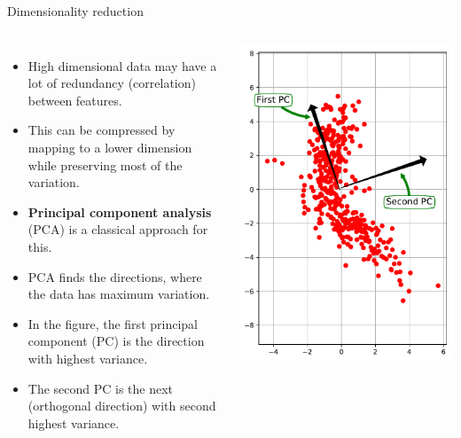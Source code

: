 \documentclass[10pt, aspectratio=169]{beamer} %
\begin{document}
\begin{frame}[fragile, allowframebreaks=0.8]{Dimensionality reduction}
		\begin{columns}
	    \begin{itemize}
			\item High dimensional data may have a lot of redundancy (correlation) between features.
			\item This can be compressed by mapping to a lower dimension while preserving most of the variation.
			\item \textbf{Principal component analysis} (PCA) is a classical approach for this.
			\item PCA finds the directions, where the data has maximum variation.
			\item In the figure, the first principal component (PC) is the direction with highest variance.
			\item The second PC is the next (orthogonal direction) with second highest variance.
	    \end{itemize}
			
		\begin{center}
			\includegraphics[width=\columnwidth]{PCA_example.pdf}
		\end{center}
		\end{columns}
\end{frame}
\end{document}
